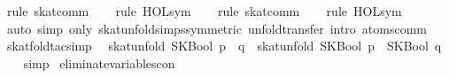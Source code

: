 \begin{isabellebody}
\ {}rule\ skat{}comm{}\isanewline
\ \ \isamarkupfalse%
\ {}rule\ HOL{}sym{}\isanewline
\ \ \isamarkupfalse%
\ {}rule\ skat{}comm{}\isanewline
\ \ \isamarkupfalse%
\ {}rule\ HOL{}sym{}\isanewline
\ \ \isamarkupfalse%
\ {}auto\ simp\ only{}\ skat{}unfold{}simps{}symmetric{}\ unfold{}transfer\ intro{}\ atoms{}comm{}%
\endisatagproof
{\isafoldproof}%
%
\isadelimproof
\isanewline
%
\endisadelimproof
\isanewline
{}\isamarkupfalse%
\ skat{}fold{}tac{}simp{}\isanewline
\ \ {}skat{}unfold\ {}SKBool\ {}p\ {}{}{}\ q{}{}\ {}\ skat{}unfold\ {}SKBool\ p\ {}{}{}\ SKBool\ q{}{}\isanewline
%
\isadelimproof
\ \ %
\endisadelimproof
%
\isatagproof
{}\isamarkupfalse%
\ simp%
\endisatagproof
{\isafoldproof}%
%
\isadelimproof
\isanewline
%
\endisadelimproof
\isanewline
{}\isamarkupfalse%
\ eliminate{}variables{}con{}\isanewline

\end{isabellebody}
